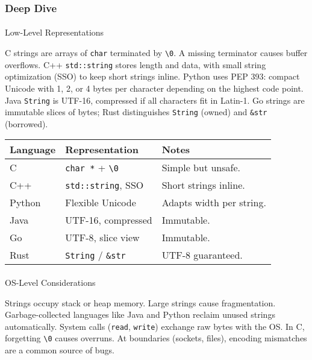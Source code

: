 \documentclass[
  letterpaper,
  DIV=11,
  numbers=noendperiod]{scrreprt}
\makeatletter
\let\oldparagraph\paragraph
\renewcommand{\paragraph}{
    \@ifstar
      \xxxParagraphStar
      \xxxParagraphNoStar
  }
\newcommand{\xxxParagraphStar}[1]{\oldparagraph*{#1}\mbox{}}
\newcommand{\xxxParagraphNoStar}[1]{\oldparagraph{#1}\mbox{}}
\makeatother
\begin{document}
\subsubsection{Deep Dive}\label{deep-dive-24}

\paragraph{Low-Level Representations}\label{low-level-representations}

C strings are arrays of \texttt{char} terminated by
\texttt{\textquotesingle{}\textbackslash{}0\textquotesingle{}}. A
missing terminator causes buffer overflows. C++ \texttt{std::string}
stores length and data, with small string optimization (SSO) to keep
short strings inline. Python uses PEP 393: compact Unicode with 1, 2, or
4 bytes per character depending on the highest code point. Java
\texttt{String} is UTF-16, compressed if all characters fit in Latin-1.
Go strings are immutable slices of bytes; Rust distinguishes
\texttt{String} (owned) and \texttt{\&str} (borrowed).

\begin{longtable}[]{@{}lll@{}}
\toprule\noalign{}
Language & Representation & Notes \\
\midrule\noalign{}
\endhead
\bottomrule\noalign{}
\endlastfoot
C & \texttt{char\ *} +
\texttt{\textquotesingle{}\textbackslash{}0\textquotesingle{}} & Simple
but unsafe. \\
C++ & \texttt{std::string}, SSO & Short strings inline. \\
Python & Flexible Unicode & Adapts width per string. \\
Java & UTF-16, compressed & Immutable. \\
Go & UTF-8, slice view & Immutable. \\
Rust & \texttt{String} / \texttt{\&str} & UTF-8 guaranteed. \\
\end{longtable}

\paragraph{OS-Level Considerations}\label{os-level-considerations}

Strings occupy stack or heap memory. Large strings cause fragmentation.
Garbage-collected languages like Java and Python reclaim unused strings
automatically. System calls (\texttt{read}, \texttt{write}) exchange raw
bytes with the OS. In C, forgetting
\texttt{\textquotesingle{}\textbackslash{}0\textquotesingle{}} causes
overruns. At boundaries (sockets, files), encoding mismatches are a
common source of bugs.
\end{document}
